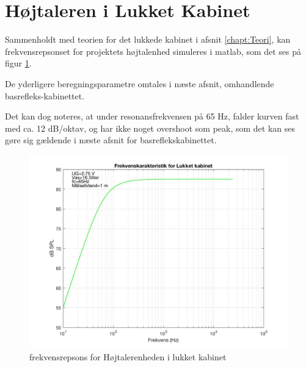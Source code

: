 \section{Højtaleren i Lukket Kabinet}

Sammenholdt med teorien for det lukkede kabinet i afsnit \ref{chapt:Teori}, kan frekvensrepsonset for projektets højtalenhed simuleres i matlab, som det ses på figur \ref{fig:simLukketKab}.

De yderligere beregningsparametre omtales i næste afsnit, omhandlende basrefleks-kabinettet. 

Det kan dog noteres, at under resonansfrekvensen på 65 Hz, falder kurven fast med ca. 12 dB/oktav, og har ikke noget overshoot som peak, som det kan ses gøre sig gældende i næste afsnit for basreflekskabinettet. 


\begin{figure}[h!]
	\centering
	\includegraphics[width=.8\textwidth]{Pics/simLukketKab}
	\caption{frekvensrepsons for Højtalerenheden i lukket kabinet } 
	\label{fig:simLukketKab}
\end{figure}

